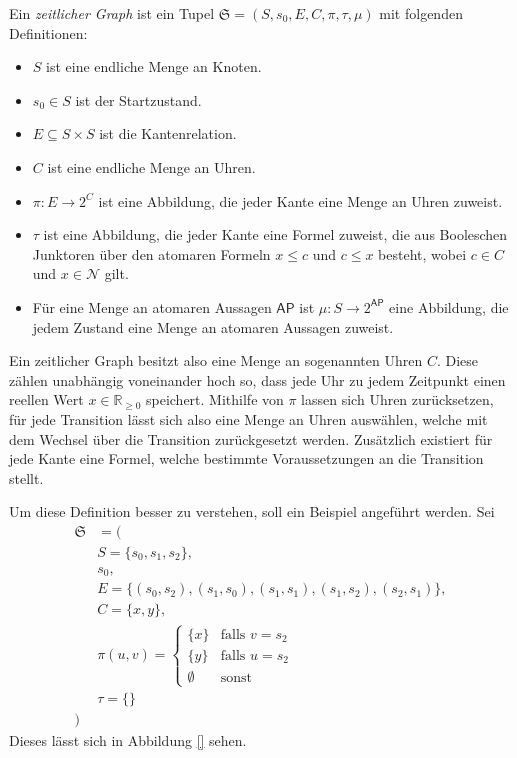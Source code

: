\begin{definition}
	Ein \textit{zeitlicher Graph} ist ein Tupel $\mathfrak{S}=(S,s_0,E,C,\pi,\tau,\mu)$ mit folgenden Definitionen:
	\begin{itemize}
		\item $S$ ist eine endliche Menge an Knoten.
		\item $s_0\in S$ ist der Startzustand.
		\item $E\subseteq S\times S$ ist die Kantenrelation.
		\item $C$ ist eine endliche Menge an Uhren.
		\item $\pi:E\to 2^C$ ist eine Abbildung, die jeder Kante eine Menge an Uhren zuweist.
		\item $\tau$ ist eine Abbildung, die jeder Kante eine Formel zuweist, die aus Booleschen Junktoren über den atomaren Formeln $x\leq c$ und $c\leq x$ besteht, wobei $c\in C$ und $x\in \mathcal{N}$ gilt.
		\item Für eine Menge an atomaren Aussagen $\mathsf{AP}$ ist $\mu:S\to 2^{\mathsf{AP}}$ eine Abbildung, die jedem Zustand eine Menge an atomaren Aussagen zuweist.
	\end{itemize}
	
	Ein zeitlicher Graph besitzt also eine Menge an sogenannten Uhren $C$.
	Diese zählen unabhängig voneinander hoch so, dass jede Uhr zu jedem \glqq Zeitpunkt\grqq{} einen reellen Wert $x\in \mathbb{R}_{\geq 0}$ speichert.
	Mithilfe von $\pi$ lassen sich Uhren zurücksetzen, für jede Transition lässt sich also eine Menge an Uhren auswählen, welche mit dem Wechsel über die Transition zurückgesetzt werden.
	Zusätzlich existiert für jede Kante eine Formel, welche bestimmte Voraussetzungen an die Transition stellt.
\end{definition}

Um diese Definition besser zu verstehen, soll ein Beispiel angeführt werden. Sei 
\begin{align*}
\mathfrak{S}&=( \\
&S= \{s_0,s_1,s_2\},\\
&s_0,\\
&E=\{(s_0,s_2),(s_1,s_0),(s_1,s_1),(s_1,s_2),(s_2,s_1)\},\\
&C=\{x,y\},\\
&\pi(u,v) = \begin{cases}
	\{x\} & \text{falls } v = s_2 \\
	\{y\} & \text{falls } u = s_2 \\
	\emptyset & \text{sonst}
\end{cases}\\
&\tau=\{\}\\
)&
\end{align*}
Dieses lässt sich in Abbildung \ref{} sehen.


